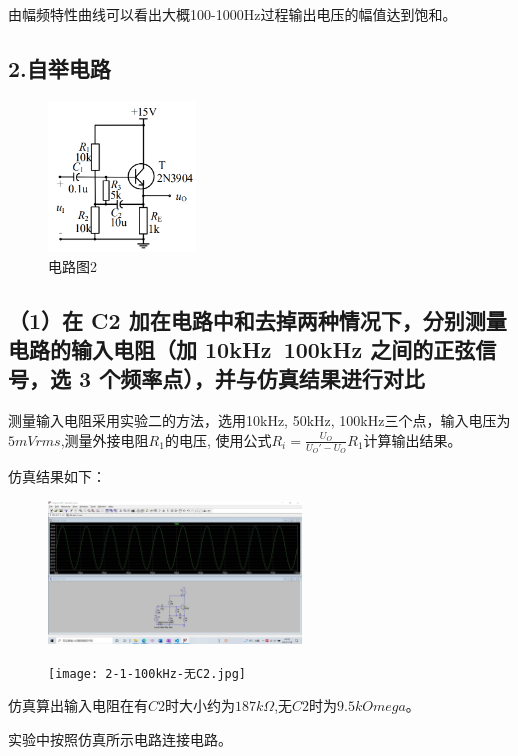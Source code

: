 \documentclass[UTF8]{ctexart}
\begin{document}
由幅频特性曲线可以看出大概100-1000Hz过程输出电压的幅值达到饱和。

\subsection*{2.自举电路}
\begin{figure}[htbp]
    \centering
    \includegraphics[width=0.35\textwidth]{电路图2.png}
    \caption{电路图2}
\end{figure}

\subsection*{（1）在 C2 加在电路中和去掉两种情况下，分别测量电路的输入电阻（加
10kHz~100kHz 之间的正弦信号，选 3 个频率点），并与仿真结果进行对比}

测量输入电阻采用实验二的方法，选用10kHz, 50kHz, 100kHz三个点，输入电压为$5mVrms$,测量外接电阻$R_1$的电压,
使用公式$R_i = \frac{U_O}{U_O' - U_O}R_1$计算输出结果。

仿真结果如下：
\begin{figure}[htbp]
    \centering
    \includegraphics[width=0.60\textwidth]{2-1-10kHz.jpg}
\end{figure}
\begin{figure}[htbp]
    \centering
    \texttt{[image: 2-1-100kHz-无C2.jpg]}
\end{figure}

仿真算出输入电阻在有$C2$时大小约为$187k \Omega$,无$C2$时为$9.5k Omega$。

实验中按照仿真所示电路连接电路。
\end{document}
